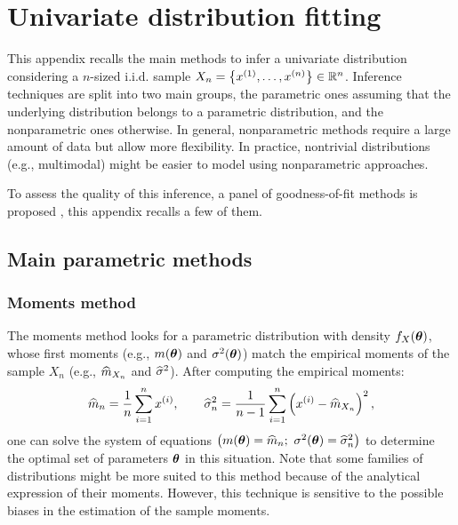 \cleardoublepage
\chapter{Univariate distribution fitting}
\label{apx:A}

This appendix recalls the main methods to infer a univariate distribution considering a $n$-sized i.i.d. sample $X_n = \left\{x^{(1)}, \dots, x^{(n)}\right\} \in \mathbb{R}^{n}$. 
Inference techniques are split into two main groups, the parametric ones assuming that the underlying distribution belongs to a parametric distribution, and the nonparametric ones otherwise. 
In general, nonparametric methods require a large amount of data but allow more flexibility. 
In practice, nontrivial distributions (e.g., multimodal) might be easier to model using nonparametric approaches.

To assess the quality of this inference, a panel of goodness-of-fit methods is proposed \citep{saporta_2006}, this appendix recalls a few of them. 

\section*{Main parametric methods}

\subsection*{Moments method}
The moments method looks for a parametric distribution with density $f_X({\boldsymbol{\theta}})$, whose first moments (e.g., $m({\boldsymbol{\theta}})$ and $\sigma^2({\boldsymbol{\theta}})$) match 
the empirical moments of the sample $X_n$ (e.g., $\widehat{m}_{X_n}$ and $\widehat{\sigma}^2$). After computing the empirical moments: 
\begin{equation}
    \widehat{m}_{n} = \frac1n \sum_{i=1}^{n} x^{(i)}, \qquad \widehat{\sigma}^2_n = \frac{1}{n-1} \sum_{i=1}^{n} \left(x^{(i)} - \widehat{m}_{X_n}\right)^2,
\end{equation} 
one can solve the system of equations $\left(m(\btheta) = \what{m}_{n}; \ \sigma^2(\btheta) = \what{\sigma}_n^2\right)$ to determine the optimal set of parameters ${\boldsymbol{\theta}}$ in this situation. 
Note that some families of distributions might be more suited to this method because of the analytical expression of their moments. 
However, this technique is sensitive to the possible biases in the estimation of the sample moments.

